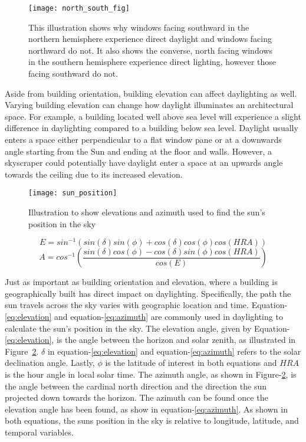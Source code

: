     \begin{figure}[h]
      \centering
      \texttt{[image: north\_south\_fig]}
      \caption{This illustration shows why windows facing southward in the northern hemisphere experience direct daylight and windows facing northward do not. It also shows the converse, north facing windows in the southern hemisphere experience direct lighting, however those facing southward do not.} 
      \label{fig:north_south}
    \end{figure}

    Aside from building orientation, building elevation can affect daylighting as well. Varying building elevation can change how daylight illuminates an architectural space. For example, a building located well above sea level will experience a slight difference in daylighting compared to a building below sea level. Daylight usually enters a space either perpendicular to a flat window pane or at a downwards angle starting from the Sun and ending at the floor and walls. However, a skyscraper could potentially have daylight enter a space at an upwards angle towards the ceiling due to its increased elevation.\\


    \begin{figure}[h]
      \centering
      \texttt{[image: sun\_position]}
      \caption{Illustration to show elevations and azimuth used to find the sun's position in the sky} 
      \label{fig:sun_position}
    \end{figure}

    \begin{equation} \label{eq:elevation}
    E = sin^{-1}(sin(\delta) sin(\phi) + cos(\delta) cos(\phi) cos(HRA))
    \end{equation}
    \begin{equation} \label{eq:azimuth}
    A = cos^{-1}( \frac{sin(\delta) cos(\phi) - cos(\delta) sin(\phi) cos(HRA)}{cos(E)})
    \end{equation}

    Just as important as building orientation and elevation, where a building is geographically built has direct impact on daylighting.
    Specifically, the path the sun travels across the sky varies with geographic location and time. 
    Equation-\ref{eq:elevation} and equation-\ref{eq:azimuth} are commonly used in daylighting to calculate the sun's position in the sky. 
    The elevation angle, given by Equation-\ref{eq:elevation}, is the angle between the horizon and solar zenith, as illustrated in Figure~\ref{fig:sun_position}. 
    $\delta$ in  equation-\ref{eq:elevation} and equation-\ref{eq:azimuth} refers to the solar declination angle. 
    Lastly, $\phi$ is the latitude of interest in both equations and $HRA$ is the hour angle in local solar time.
    The azimuth angle, as shown in Figure-\ref{fig:sun_position}, is the angle between the cardinal north direction and the direction the sun projected down towards the horizon. The azimuth can be found once the elevation angle has been found, as show in equation-\ref{eq:azimuth}.
    As shown in both equations, the suns position in the sky is relative to longitude, latitude, and temporal variables.\\

